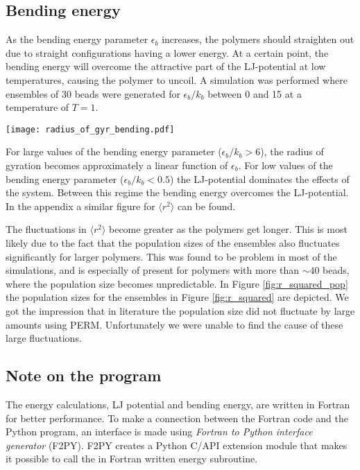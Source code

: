 \subsection{Bending energy}

As the bending energy parameter $\epsilon_b$ increases, the polymers should straighten out due to straight configurations having a lower energy. At a certain point, the bending energy will overcome the attractive part of the LJ-potential at low temperatures, causing the polymer to uncoil. A simulation was performed where ensembles of 30 beads were generated for $\epsilon_b/k_b$ between 0 and 15 at a temperature of $T = 1$.

\begin{Figure}
  \centerfloat
     \texttt{[image: radius\_of\_gyr\_bending.pdf]}
 \label{fig:radius_of_gyr_bending}
\end{Figure}

For large values of the bending energy parameter ($\epsilon_b/k_b>6$), the radius of gyration becomes approximately a linear function of $\epsilon_b$. For low values
of the bending energy parameter ($\epsilon_b/k_b<0.5$) the LJ-potential dominates the effects of the system. Between this regime the bending energy overcomes the LJ-potential. In the appendix a similar figure for $\langle r^2\rangle$ can be found.

The fluctuations in $\langle r^2\rangle$ become greater as the polymers get longer. This is most likely due to the fact that the population sizes of the ensembles also fluctuates significantly for larger polymers. This was found to be problem in most of the simulations, and is especially of present for polymers with more than $\sim 40$ beads, where the population size becomes unpredictable. In Figure \ref{fig:r_squared_pop} the population sizes for the ensembles in Figure \ref{fig:r_squared} are depicted. We got the impression that in literature the population size did not fluctuate by large amounts using PERM. Unfortunately we were unable to find the cause of these large fluctuations.

\subsection{Note on the program}
The energy calculations, LJ potential and bending energy, are written in Fortran for better performance. To make a connection between the Fortran code and the Python program, an interface is made using \emph{Fortran to Python interface generator} (F2PY). F2PY creates a Python C/API extension module that makes it possible to call the in Fortran written energy subroutine.